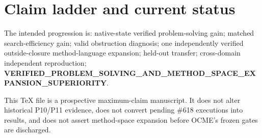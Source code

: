 \section{Claim ladder and current status}
The intended progression is: native-state verified problem-solving gain; matched search-efficiency gain; valid obstruction diagnosis; one independently verified outside-closure method-language expansion; held-out transfer; cross-domain independent reproduction; \textbf{VERIFIED\_PROBLEM\_SOLVING\_AND\_METHOD\_SPACE\_EXPANSION\_SUPERIORITY}.

This TeX file is a prospective maximum-claim manuscript. It does not alter historical P10/P11 evidence, does not convert pending \#618 executions into results, and does not assert method-space expansion before OCME's frozen gates are discharged.

